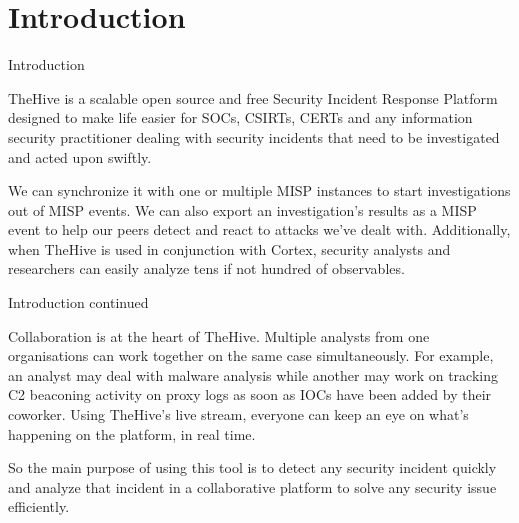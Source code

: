 \section{Introduction}
\begin{frame}{Introduction}
\begin{justify}
            TheHive is a scalable open source and free Security Incident Response Platform designed to make life easier for SOCs, CSIRTs, CERTs and any information security practitioner dealing with security incidents that need to be investigated and acted upon swiftly.
            \vspace{1em}

            We can synchronize it with one or multiple MISP instances to start investigations out of MISP events. We can also export an investigation's results as a MISP event to help our peers detect and react to attacks we've dealt with. Additionally, when TheHive is used in conjunction with Cortex, security analysts and researchers can easily analyze tens if not hundred of observables.
            
\end{justify}
\end{frame}


\begin{frame}{Introduction continued}
\begin{justify}
            Collaboration is at the heart of TheHive. Multiple analysts from one organisations can work together on the same case simultaneously. For example, an analyst may deal with malware analysis while another may work on tracking C2 beaconing activity on proxy logs as soon as IOCs have been added by their coworker. Using TheHive's live stream, everyone can keep an eye on what's happening on the platform, in real time.
            \vspace{1em}

            So the main purpose of using this tool is to detect any security incident quickly and analyze that incident in a collaborative platform to solve any security issue efficiently.
            
\end{justify}
\end{frame}

